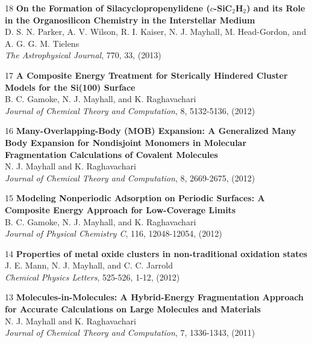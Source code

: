 \documentclass[10pt]{article}
\newenvironment{lonelist}[1][\enskip\textbullet]%
        {\vspace{-\baselineskip}\begin{list}{#1}{%
        \setlength{\partopsep}{0pt}%
        \setlength{\topsep}{0pt}}}
        {\end{list}\vspace{-.6\baselineskip}}
\begin{document}
\begin{lonelist}
\item[18\hspace{4pt}] \textbf{On the Formation of Silacyclopropenylidene ($c$-SiC$_2$H$_2$) and its Role in the Organosilicon Chemistry in the Interstellar Medium}\\
D. S. N. Parker, A. V. Wilson, R. I. Kaiser, N. J. Mayhall, M. Head-Gordon, and A. G. G. M. Tielens\\
\textsl{The Astrophysical Journal}, 770, 33, (2013)

\item[17\hspace{4pt}] \textbf{A Composite Energy Treatment for Sterically Hindered Cluster Models for the Si(100) Surface}\\
B. C. Gamoke, N. J. Mayhall, and K. Raghavachari \\
\textsl{Journal of Chemical Theory and Computation}, 8, 5132-5136, (2012)

\item [16\hspace{4pt}]
\textbf{Many-Overlapping-Body (MOB) Expansion: A Generalized Many Body Expansion for Nondisjoint Monomers in Molecular Fragmentation Calculations of Covalent Molecules} \\
N. J. Mayhall and K. Raghavachari \\
\textsl{Journal of Chemical Theory and Computation}, 8, 2669-2675, (2012)

\item[15\hspace{4pt}] \textbf{Modeling Nonperiodic Adsorption on Periodic Surfaces: A Composite Energy Approach for Low-Coverage Limits}\\
B. C. Gamoke, N. J. Mayhall, and K. Raghavachari \\
\textsl{Journal of Physical Chemistry C}, 116, 12048-12054, (2012)

\item[14\hspace{4pt}] \textbf{Properties of metal oxide clusters in non-traditional oxidation states}\\
J. E. Mann, N. J. Mayhall, and C. C. Jarrold\\
 \textsl{Chemical Physics Letters}, 525-526, 1-12, (2012)

\item[13\hspace{4pt}] \textbf{Molecules-in-Molecules: A Hybrid-Energy Fragmentation Approach for Accurate Calculations on Large Molecules and Materials}\\
N. J. Mayhall and K. Raghavachari\\
\textsl{Journal of Chemical Theory and Computation}, 7, 1336-1343, (2011)


\end{lonelist}
\end{document}
